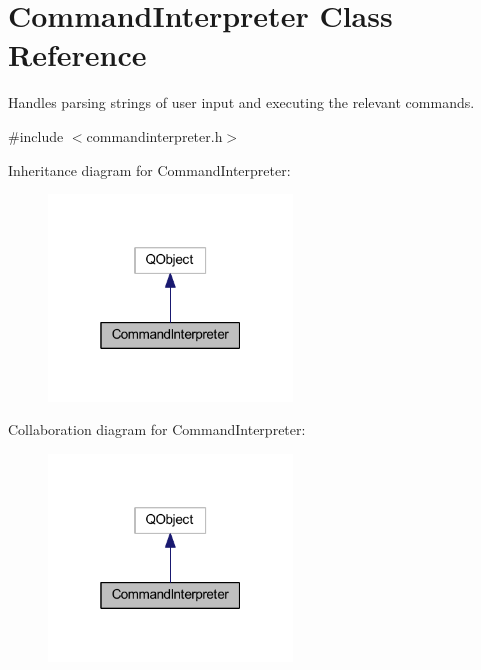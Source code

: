 \hypertarget{class_command_interpreter}{\section{Command\-Interpreter Class Reference}
\label{class_command_interpreter}
}


Handles parsing strings of user input and executing the relevant commands.  




{\ttfamily \#include $<$commandinterpreter.\-h$>$}



Inheritance diagram for Command\-Interpreter\-:\nopagebreak
\begin{figure}[H]
\begin{center}
\leavevmode
\includegraphics[width=184pt]{class_command_interpreter__inherit__graph}
\end{center}
\end{figure}


Collaboration diagram for Command\-Interpreter\-:\nopagebreak
\begin{figure}[H]
\begin{center}
\leavevmode
\includegraphics[width=184pt]{class_command_interpreter__coll__graph}
\end{center}
\end{figure}
